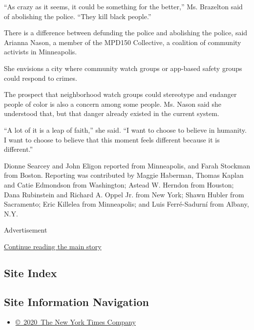 ``As crazy as it seems, it could be something for the better,'' Ms.
Brazelton said of abolishing the police. ``They kill black people.''

There is a difference between defunding the police and abolishing the
police, said Arianna Nason, a member of the MPD150 Collective, a
coalition of community activists in Minneapolis.

She envisions a city where community watch groups or app-based safety
groups could respond to crimes.

The prospect that neighborhood watch groups could stereotype and
endanger people of color is also a concern among some people. Ms. Nason
said she understood that, but that danger already existed in the current
system.

``A lot of it is a leap of faith,'' she said. ``I want to choose to
believe in humanity. I want to choose to believe that this moment feels
different because it is different.''

Dionne Searcey and John Eligon reported from Minneapolis, and Farah
Stockman from Boston. Reporting was contributed by Maggie Haberman,
Thomas Kaplan and Catie Edmondson from Washington; Astead W. Herndon
from Houston; Dana Rubinstein and Richard A. Oppel Jr. from New York;
Shawn Hubler from Sacramento; Eric Killelea from Minneapolis; and Luis
Ferré-Sadurní from Albany, N.Y.

Advertisement

\protect\hyperlink{after-bottom}{Continue reading the main story}

\hypertarget{site-index}{%
\subsection{Site Index}\label{site-index}}

\hypertarget{site-information-navigation}{%
\subsection{Site Information
Navigation}\label{site-information-navigation}}

\begin{itemize}
\tightlist
\item
  \href{https://help.nytimes.com/hc/en-us/articles/115014792127-Copyright-notice}{©~2020~The
  New York Times Company}
\end{itemize}

